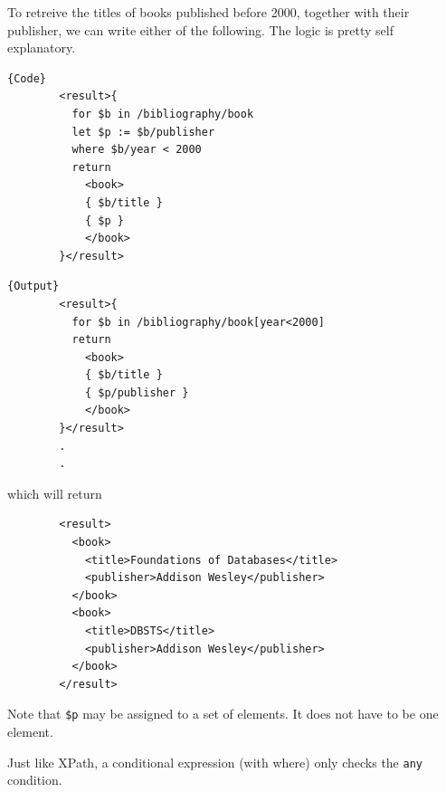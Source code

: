 \documentclass{article}
\begin{document}
    \begin{example}
      To retreive the titles of books published before 2000, together with their publisher, we can write either of the following. The logic is pretty self explanatory. 

      \noindent\begin{minipage}{.5\textwidth}
      \begin{lstlisting}[]{Code}
        <result>{
          for $b in /bibliography/book 
          let $p := $b/publisher 
          where $b/year < 2000 
          return 
            <book>
            { $b/title }
            { $p }
            </book>
        }</result>
      \end{lstlisting}
      \end{minipage}
      \hfill
      \begin{minipage}{.49\textwidth}
      \begin{lstlisting}[]{Output}
        <result>{
          for $b in /bibliography/book[year<2000]
          return 
            <book>
            { $b/title }
            { $p/publisher }
            </book>
        }</result>
        .
        .
      \end{lstlisting}
      \end{minipage}
      which will return 
      \begin{lstlisting}
        <result>
          <book>
            <title>Foundations of Databases</title>
            <publisher>Addison Wesley</publisher>
          </book>
          <book>
            <title>DBSTS</title>
            <publisher>Addison Wesley</publisher>
          </book>
        </result> 
      \end{lstlisting}
      Note that \texttt{\$p} may be assigned to a set of elements. It does not have to be one element. 
    \end{example}

    Just like XPath, a conditional expression (with where) only checks the \texttt{any} condition. 
    
\end{document}
